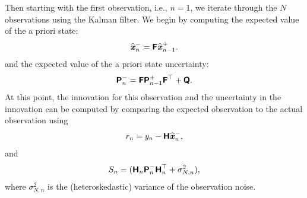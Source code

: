 \documentclass[a4paper,fleqn,usenatbib]{mnras}
\begin{document}
Then starting with the first observation, i.e., $n = 1$, we iterate through the $N$ observations using the Kalman filter. We begin by computing the expected value of the a priori state:
\begin{equation}\label{eq:APrioriState}
\widehat{\textbf{\textit{x}}}^{-}_{n} = \textbf{\textsf{F}} \widehat{\textbf{\textit{x}}}^{+}_{n-1}.
\end{equation}
and the expected value of the a priori state uncertainty:
\begin{equation}\label{eq:APrioriUncertainty}
\textbf{\textsf{P}}^{-}_{n} = \textbf{\textsf{F}} \textbf{\textsf{P}}^{+}_{n-1} \textbf{\textsf{F}}^{\top} + \textbf{\textsf{Q}}.
\end{equation}
At this point, the innovation for this observation and the uncertainty in the innovation can be computed by comparing the expected observation to the actual observation using 
\begin{equation}\label{eq:Innovation}
r_{n} = y_{n} - \textbf{\textsf{H}}\widehat{\textbf{\textit{x}}}^{-}_{n},
\end{equation}
and
\begin{equation}\label{eq:InnovationVar}
S_{n} = ( \textbf{\textsf{H}}_{n} \textbf{\textsf{P}}^{-}_{n} \textbf{\textsf{H}}_{n}^{\top} + \sigma^{2}_{N,n}),
\end{equation}
where $\sigma^{2}_{N,n}$ is the (heteroskedastic) variance of the observation noise. 
\end{document}
